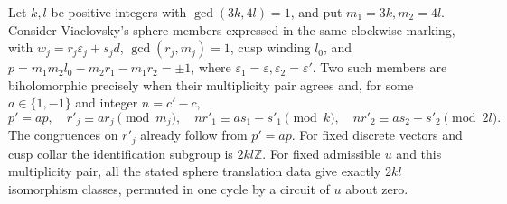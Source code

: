 \begin{proposition}\hypertarget{tag-01QE}{}\label{fam:src:B.3.1}\label{fam:st:B.3.1}

Let $k,l$ be positive integers with $\gcd(3k,4l)=1$, and put $m_1=3k,m_2=4l$. Consider Viaclovsky's sphere members expressed in the same clockwise marking, with $w_j=r_j\varepsilon_j+s_jd$, $\gcd(r_j,m_j)=1$, cusp winding $l_0$, and $p=m_1m_2l_0-m_2r_1-m_1r_2=\pm1$, where $\varepsilon_1=\varepsilon,\varepsilon_2=\varepsilon'$. Two such members are biholomorphic precisely when their multiplicity pair agrees and, for some $a\in\{1,-1\}$ and integer $n=c'-c$,
\[
 p'=ap,\quad r'_j\equiv ar_j\pmod{m_j},\quad
 nr'_1\equiv as_1-s'_1\pmod{k},\quad
 nr'_2\equiv as_2-s'_2\pmod{2l}.
\]
The congruences on $r'_j$ already follow from $p'=ap$. For fixed discrete vectors and cusp collar the identification subgroup is $2kl\mathbb Z$. For fixed admissible $u$ and this multiplicity pair, all the stated sphere translation data give exactly $2kl$ isomorphism classes, permuted in one cycle by a circuit of $u$ about zero.
\end{proposition}


